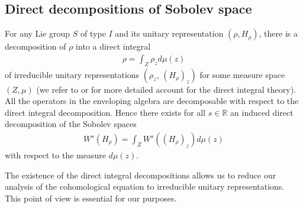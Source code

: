 \documentclass[11 pt]{amsart}
\newcommand{\RR}{\mathbb{R}}
\theoremstyle{definition}
\numberwithin{equation}{section}
\begin{document}
\subsection{Direct decompositions of Sobolev space}\label{sec:20}
For any Lie group $S$ of type $I$ and its unitary representation $(\rho, H_\rho)$, there is a decomposition of $\rho$ into a direct integral
\begin{align*}
  \rho=\int_Z\rho_zd\mu(z)
\end{align*}
of irreducible unitary representations $(\rho_z,\,(H_\rho)_z)$ for some measure space $(Z,\mu)$ (we refer to
\cite[Chapter 2.3]{Zimmer} or \cite{margulis1991discrete} for more detailed account for the direct integral theory). All the operators in the enveloping algebra are decomposable with respect to the direct integral decomposition. Hence there exists for all $s\in\RR$ an induced direct
decomposition of the Sobolev spaces
\begin{align*}
 W^s(H_\rho)=\int_Z W^s((H_\rho)_z)d\mu(z)
\end{align*}
with respect to the measure $d\mu(z)$.

The existence of the direct integral decompositions allows us to reduce our analysis of the
cohomological equation to irreducible unitary representations. This point of view is
essential for our purposes.
\end{document}
